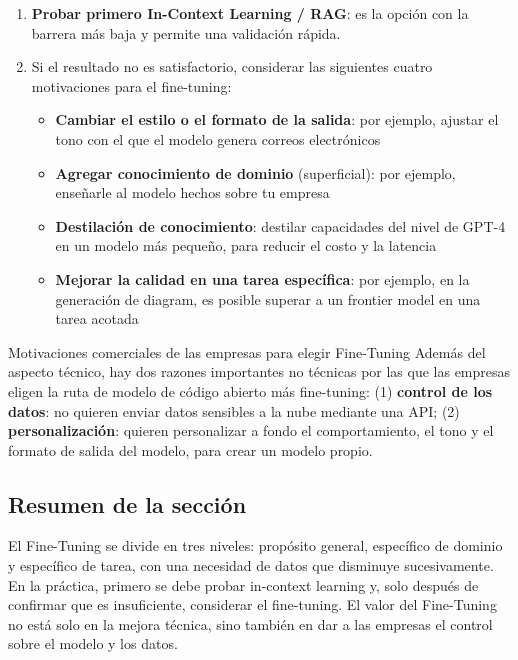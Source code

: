 \begin{enumerate}
    \item \textbf{Probar primero In-Context Learning / RAG}: es la opción con la barrera más baja y permite una validación rápida.
    \item Si el resultado no es satisfactorio, considerar las siguientes cuatro motivaciones para el fine-tuning:
    \begin{itemize}
        \item \textbf{Cambiar el estilo o el formato de la salida}: por ejemplo, ajustar el tono con el que el modelo genera correos electrónicos
        \item \textbf{Agregar conocimiento de dominio} (superficial): por ejemplo, enseñarle al modelo hechos sobre tu empresa
        \item \textbf{Destilación de conocimiento}: destilar capacidades del nivel de GPT-4 en un modelo más pequeño, para reducir el costo y la latencia
        \item \textbf{Mejorar la calidad en una tarea específica}: por ejemplo, en la generación de diagram, es posible superar a un frontier model en una tarea acotada
    \end{itemize}
\end{enumerate}

\begin{knowledgebox}{Motivaciones comerciales de las empresas para elegir Fine-Tuning}
Además del aspecto técnico, hay dos razones importantes no técnicas por las que las empresas eligen la ruta de modelo de código abierto más fine-tuning: (1) \textbf{control de los datos}: no quieren enviar datos sensibles a la nube mediante una API; (2) \textbf{personalización}: quieren personalizar a fondo el comportamiento, el tono y el formato de salida del modelo, para crear un modelo propio.
\end{knowledgebox}

\subsection{Resumen de la sección}

El Fine-Tuning se divide en tres niveles: propósito general, específico de dominio y específico de tarea, con una necesidad de datos que disminuye sucesivamente. En la práctica, primero se debe probar in-context learning y, solo después de confirmar que es insuficiente, considerar el fine-tuning. El valor del Fine-Tuning no está solo en la mejora técnica, sino también en dar a las empresas el control sobre el modelo y los datos.

\newpage
